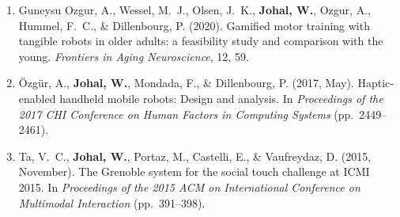 \begin{enumerate}[nosep]
    \item Guneysu Ozgur, A., Wessel, M.\ J., Olsen, J.\ K., \textbf{Johal, W.}, Ozgur, A., Hummel, F.\ C., \& Dillenbourg, P. (2020). Gamified motor training with tangible robots in older adults: a feasibility study and comparison with the young. \textit{Frontiers in Aging Neuroscience}, 12, 59.
    \item Özgür, A., \textbf{Johal, W.}, Mondada, F., \& Dillenbourg, P. (2017, May). Haptic-enabled handheld mobile robots: Design and analysis. In \textit{Proceedings of the 2017 CHI Conference on Human Factors in Computing Systems} (pp.\ 2449--2461).
    \item Ta, V.\ C., \textbf{Johal, W.}, Portaz, M., Castelli, E., \& Vaufreydaz, D. (2015, November). The Grenoble system for the social touch challenge at ICMI 2015. In \textit{Proceedings of the 2015 ACM on International Conference on Multimodal Interaction} (pp.\ 391--398).
\end{enumerate}
